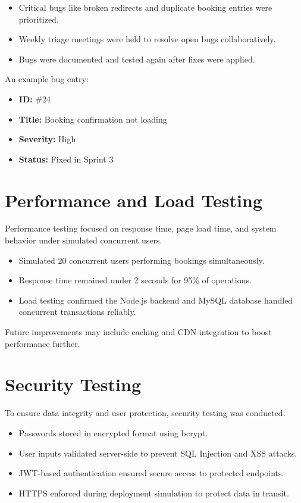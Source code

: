 \begin{itemize}
    \item Critical bugs like broken redirects and duplicate booking entries were prioritized.
    \item Weekly triage meetings were held to resolve open bugs collaboratively.
    \item Bugs were documented and tested again after fixes were applied.
\end{itemize}

An example bug entry:
\begin{itemize}
    \item \textbf{ID:} \#24
    \item \textbf{Title:} Booking confirmation not loading
    \item \textbf{Severity:} High
    \item \textbf{Status:} Fixed in Sprint 3
\end{itemize}

\section{Performance and Load Testing}
Performance testing focused on response time, page load time, and system behavior under simulated concurrent users.

\begin{itemize}
    \item Simulated 20 concurrent users performing bookings simultaneously.
    \item Response time remained under 2 seconds for 95\% of operations.
    \item Load testing confirmed the Node.js backend and MySQL database handled concurrent transactions reliably.
\end{itemize}

Future improvements may include caching and CDN integration to boost performance further.

\section{Security Testing}
To ensure data integrity and user protection, security testing was conducted.

\begin{itemize}
    \item Passwords stored in encrypted format using bcrypt.
    \item User inputs validated server-side to prevent SQL Injection and XSS attacks.
    \item JWT-based authentication ensured secure access to protected endpoints.
    \item HTTPS enforced during deployment simulation to protect data in transit.
\end{itemize}

